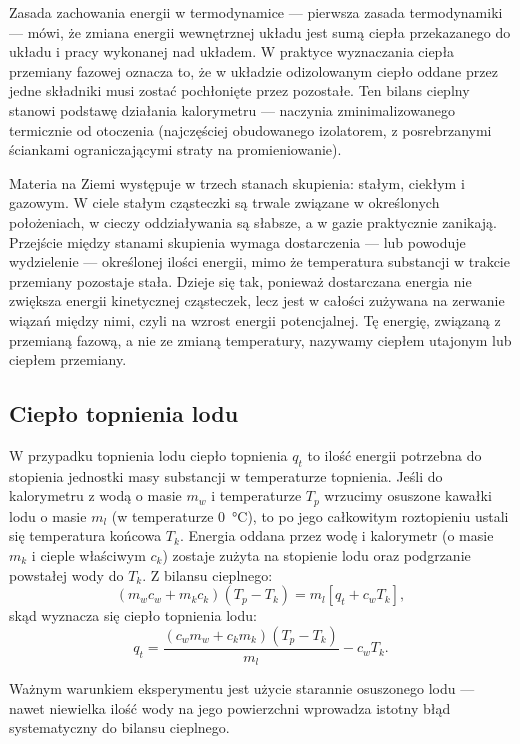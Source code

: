 \documentclass[12pt, a4paper]{article}
\begin{document}
Zasada zachowania energii w termodynamice --- pierwsza zasada termodynamiki ---
mówi, że zmiana energii wewnętrznej układu jest sumą ciepła przekazanego do
układu i pracy wykonanej nad układem. W praktyce wyznaczania ciepła przemiany
fazowej oznacza to, że w układzie odizolowanym ciepło oddane przez jedne
składniki musi zostać pochłonięte przez pozostałe. Ten bilans cieplny stanowi
podstawę działania kalorymetru --- naczynia zminimalizowanego termicznie od
otoczenia (najczęściej obudowanego izolatorem, z posrebrzanymi ściankami
ograniczającymi straty na promieniowanie).

Materia na Ziemi występuje w trzech stanach skupienia: stałym, ciekłym i
gazowym. W ciele stałym cząsteczki są trwale związane w określonych
położeniach, w cieczy oddziaływania są słabsze, a w gazie praktycznie zanikają.
Przejście między stanami skupienia wymaga dostarczenia --- lub powoduje
wydzielenie --- określonej ilości energii, mimo że temperatura substancji w
trakcie przemiany pozostaje stała. Dzieje się tak, ponieważ dostarczana energia
nie zwiększa energii kinetycznej cząsteczek, lecz jest w całości zużywana na
zerwanie wiązań między nimi, czyli na wzrost energii potencjalnej. Tę energię,
związaną z przemianą fazową, a nie ze zmianą temperatury, nazywamy ciepłem
utajonym lub ciepłem przemiany.

\subsection{Ciepło topnienia lodu}
W przypadku topnienia lodu ciepło topnienia $q_t$ to ilość energii potrzebna do
stopienia jednostki masy substancji w temperaturze topnienia. Jeśli do
kalorymetru z wodą o masie $m_w$ i temperaturze $T_p$ wrzucimy osuszone kawałki
lodu o masie $m_l$ (w temperaturze \qty{0}{\degreeCelsius}), to po jego
całkowitym roztopieniu ustali się temperatura końcowa $T_k$. Energia oddana
przez wodę i kalorymetr (o masie $m_k$ i cieple właściwym $c_k$) zostaje zużyta
na stopienie lodu oraz podgrzanie powstałej wody do $T_k$. Z bilansu cieplnego:
\begin{equation}
    (m_w c_w + m_k c_k)(T_p - T_k) = m_l\left[q_t + c_w T_k\right],
\end{equation}
skąd wyznacza się ciepło topnienia lodu:
\begin{equation}
    q_t = \frac{(c_w m_w + c_k m_k)(T_p - T_k)}{m_l} - c_w T_k.
    \label{eq:qt}
\end{equation}

Ważnym warunkiem eksperymentu jest użycie starannie osuszonego lodu --- nawet
niewielka ilość wody na jego powierzchni wprowadza istotny błąd systematyczny
do bilansu cieplnego.
\end{document}
